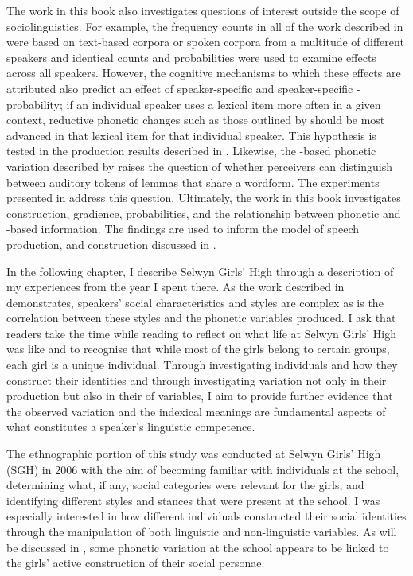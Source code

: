 The work in this book also investigates questions of interest outside the scope of sociolinguistics. For example, the frequency counts in all of the work described in  were based on text-based corpora or spoken corpora from a multitude of different speakers and identical  counts and  probabilities were used to examine effects across all speakers. However, the cognitive mechanisms to which these effects are attributed also predict an effect of speaker-specific  and speaker-specific -probability; if an individual speaker uses a lexical item more often in a given context, reductive phonetic changes such as those outlined by \citet{bybee2002} should be most advanced in that lexical item for that individual speaker. This hypothesis is tested in the production results described in . Likewise, the -based phonetic variation described by \citet{gahl-thyme} raises the question of whether perceivers can distinguish between auditory tokens of lemmas that share a wordform. The experiments presented in  address this question. Ultimately, the work in this book investigates  construction, gradience,  probabilities, and the relationship between phonetic and -based information. The findings are used to inform the model of speech production,  and  construction discussed in . 

In the following chapter, I describe Selwyn Girls' High through a description of my experiences from the year I spent there. As the work described in  demonstrates, speakers' social characteristics and styles are complex as is the correlation between these styles and the phonetic variables produced. I ask that readers take the time while reading  to reflect on what life at Selwyn Girls' High was like and to recognise that while most of the girls belong to certain groups, each girl is a unique individual. Through investigating individuals and how they construct their identities and through investigating variation not only in their production but also in their  of variables, I aim to provide further evidence that the observed variation and the indexical meanings are fundamental aspects of what constitutes a speaker's linguistic competence.


The ethnographic portion of this study was conducted at Selwyn Girls' High (SGH) in 2006 with the aim of becoming familiar with individuals at the school, determining what, if any, social categories were relevant for the girls, and identifying different styles and stances that were present at the school. I was especially interested in how different individuals constructed their social identities through the manipulation of both linguistic and non-linguistic variables. As will be discussed in , some phonetic variation at the school appears to be linked to the girls' active construction of their social personae. 

